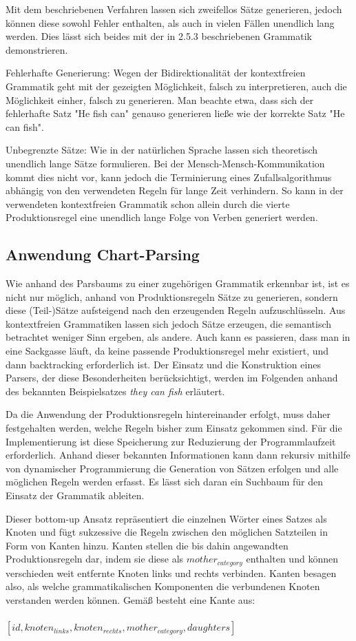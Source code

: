 \documentclass[12pt]{report}
\begin{document}
Mit dem beschriebenen Verfahren lassen sich zweifellos Sätze generieren, jedoch können diese sowohl Fehler enthalten, als auch in vielen Fällen unendlich lang werden. Dies lässt sich beides mit der in 2.5.3 beschriebenen Grammatik demonstrieren. 

Fehlerhafte Generierung: Wegen der Bidirektionalität der kontextfreien Grammatik geht mit der gezeigten Möglichkeit, falsch zu interpretieren, auch die Möglichkeit einher, falsch zu generieren. Man beachte etwa, dass sich der fehlerhafte Satz "He fish can" genauso generieren ließe wie der korrekte Satz "He can fish".

Unbegrenzte Sätze: Wie in der natürlichen Sprache lassen sich theoretisch unendlich lange Sätze formulieren. Bei der Mensch-Mensch-Kommunikation kommt dies nicht vor, kann jedoch die Terminierung eines Zufallsalgorithmus abhängig von den verwendeten Regeln für lange Zeit verhindern. So kann in der verwendeten kontextfreien Grammatik schon allein durch die vierte Produktionsregel eine unendlich lange Folge von Verben generiert werden.

\subsection{Anwendung Chart-Parsing}
Wie anhand des Parsbaums zu einer zugehörigen Grammatik erkennbar ist, ist es nicht nur möglich, anhand von Produktionsregeln Sätze zu generieren, sondern diese (Teil-)Sätze aufsteigend nach den erzeugenden Regeln aufzuschlüsseln. Aus kontextfreien Grammatiken lassen sich jedoch Sätze erzeugen, die semantisch betrachtet weniger Sinn ergeben, als andere. Auch kann es passieren, dass man in eine Sackgasse läuft, da keine passende Produktionsregel mehr existiert, und dann backtracking erforderlich ist. Der Einsatz und die Konstruktion eines Parsers, der diese Besonderheiten berücksichtigt, werden im Folgenden anhand des bekannten Beispielsatzes \textit{they can fish} erläutert.

Da die Anwendung der Produktionsregeln hintereinander erfolgt, muss daher festgehalten werden, welche Regeln bisher zum Einsatz gekommen sind. Für die Implementierung ist diese Speicherung zur Reduzierung der Programmlaufzeit erforderlich. Anhand dieser bekannten Informationen kann dann rekursiv mithilfe von dynamischer Programmierung die Generation von Sätzen erfolgen und alle möglichen Regeln werden erfasst. Es lässt sich daran ein Suchbaum für den Einsatz der Grammatik ableiten. 

Dieser bottom-up Ansatz repräsentiert die einzelnen Wörter eines Satzes als Knoten und fügt sukzessive die Regeln zwischen den möglichen Satzteilen in Form von Kanten hinzu. Kanten stellen die bis dahin angewandten Produktionsregeln dar, indem sie diese als \textit{$mother_{category}$} enthalten und können verschieden weit entfernte Knoten links und rechts verbinden. Kanten besagen also, als welche grammatikalischen Komponenten die verbundenen Knoten verstanden werden können. Gemäß \cite{cop04} besteht eine Kante aus:
\\
\tt
\\$[id, knoten_{links}, knoten_{rechts}, mother_{category}, daughters]$
\rm
\\
\end{document}
